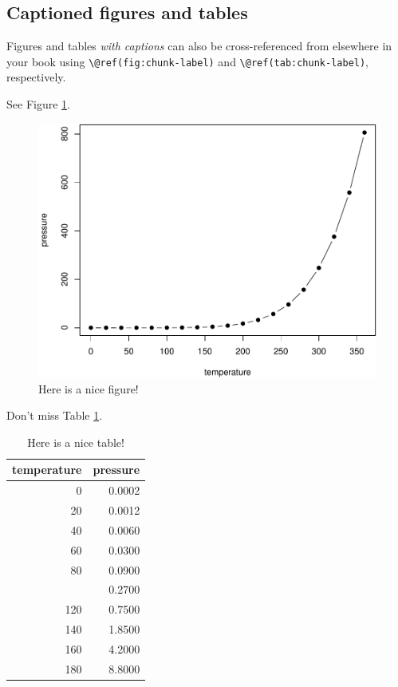 \documentclass[
]{book}
\theoremstyle{definition}
\theoremstyle{definition}
\theoremstyle{definition}
\theoremstyle{definition}
\theoremstyle{remark}
\begin{document}
\hypertarget{captioned-figures-and-tables}{%
\subsection{Captioned figures and tables}\label{captioned-figures-and-tables}}

Figures and tables \emph{with captions} can also be cross-referenced from elsewhere in your book using \texttt{\textbackslash{}@ref(fig:chunk-label)} and \texttt{\textbackslash{}@ref(tab:chunk-label)}, respectively.

See Figure \ref{fig:nice-fig}.

\begin{figure}

{\centering \includegraphics[width=0.8\linewidth]{_main_files/figure-latex/nice-fig-1} 

}

\caption{Here is a nice figure!}\label{fig:nice-fig}
\end{figure}

Don't miss Table \ref{tab:nice-tab}.

\begin{table}

\caption{\label{tab:nice-tab}Here is a nice table!}
\centering
\begin{tabular}[t]{rr}
\toprule
temperature & pressure\\
\midrule
0 & 0.0002\\
20 & 0.0012\\
40 & 0.0060\\
60 & 0.0300\\
80 & 0.0900\\
\addlinespace
100 & 0.2700\\
120 & 0.7500\\
140 & 1.8500\\
160 & 4.2000\\
180 & 8.8000\\
\bottomrule
\end{tabular}
\end{table}
\end{document}
